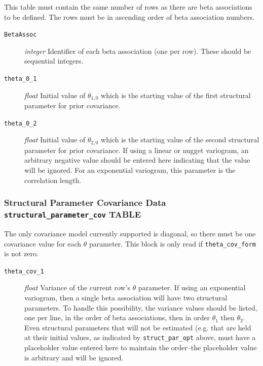 \documentclass[11pt,oneside,onecolumn]{usgsreport}
\begin{document}
\begin{appendix}
\begin{bibunit}
This table must contain the same number of rows as there are beta
associations to be defined. The rows must be in ascending order of
beta association numbers.
\begin{description}
\item [{\texttt{BetaAssoc}}] \emph{integer }Identifier of each beta association
(one per row). These should be sequential integers.
\item [{\texttt{theta\_0\_1}}] \emph{float }Initial value of $\theta_{1,0}$
which is the starting value of the first structural parameter for
prior covariance.
\item [{\texttt{theta\_0\_2}}] \emph{float }Initial value of $\theta_{2,0}$
which is the starting value of the second structural parameter for
prior covariance. If using a linear or nugget variogram, an arbitrary
negative value should be entered here indicating that the value will
be ignored. For an exponential variogram, this parameter is the correlation
length.
\end{description}

\subsubsection{Structural Parameter Covariance Data \texttt{structural\_parameter\_cov}
TABLE}

The only covariance model currently supported is diagonal, so there
must be one covariance value for each $\theta$ parameter. This block
is only read if \texttt{theta\_cov\_form} is not zero.
\begin{description}
\item [{\texttt{theta\_cov\_1}}] \emph{float }Variance of the current row's
$\theta$ parameter. If using an exponential variogram, then a single
beta association will have two structural parameters. To handle this
possibility, the variance values should be listed, one per line, in
the order of beta associations, then in order $\theta_{1}$ then $\theta_{2}$.
Even structural parameters that will not be estimated (e.g. that are
held at their initial values, as indicated by \texttt{struct\_par\_opt}
above, must have a placeholder value entered here to maintain the
order--the placeholder value is arbitrary and will be ignored. 
\end{description}


\end{bibunit}
\end{appendix}
\end{document}
